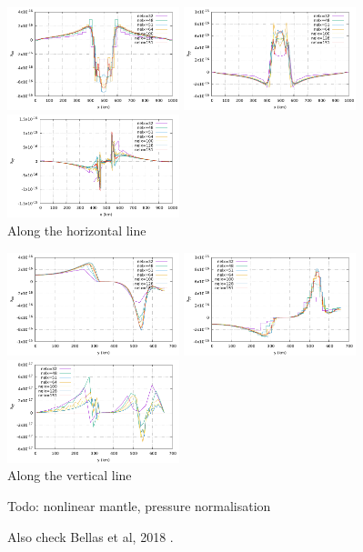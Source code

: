 \begin{center}
\includegraphics[width=5cm]{python_codes/fieldstone_26/images/horizontal_exx.pdf}
\includegraphics[width=5cm]{python_codes/fieldstone_26/images/horizontal_eyy.pdf}
\includegraphics[width=5cm]{python_codes/fieldstone_26/images/horizontal_exy.pdf}\\
Along the horizontal line
\end{center}

\begin{center}
\includegraphics[width=5cm]{python_codes/fieldstone_26/images/vertical_exx.pdf}
\includegraphics[width=5cm]{python_codes/fieldstone_26/images/vertical_eyy.pdf}
\includegraphics[width=5cm]{python_codes/fieldstone_26/images/vertical_exy.pdf}\\
Along the vertical line
\end{center}





Todo: nonlinear mantle, pressure normalisation 

Also check Bellas et al, 2018 \cite{bezb18}.
